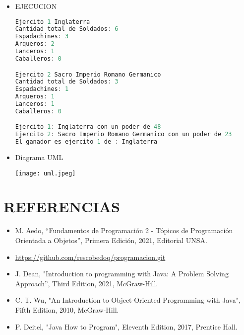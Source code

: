 \documentclass{article}
\begin{document}
\begin{itemize}
\begin{lstlisting}[language=java]
        \end{lstlisting}

        \item EJECUCION
        \begin{lstlisting}[language=java]
Ejercito 1 Inglaterra
Cantidad total de Soldados: 6
Espadachines: 3
Arqueros: 2
Lanceros: 1
Caballeros: 0

Ejercito 2 Sacro Imperio Romano Germanico
Cantidad total de Soldados: 3
Espadachines: 1
Arqueros: 1
Lanceros: 1
Caballeros: 0

Ejercito 1: Inglaterra con un poder de 48
Ejercito 2: Sacro Imperio Romano Germanico con un poder de 23
El ganador es ejercito 1 de : Inglaterra
        \end{lstlisting}

        \item Diagrama UML
 
             \texttt{[image: uml.jpeg]}
        
	\end{itemize}

	\section{REFERENCIAS}
	\begin{itemize}
		\item M. Aedo, “Fundamentos de Programación 2 - Tópicos de Programación Orientada a Objetos”, Primera Edición, 2021, Editorial UNSA.
		\item \url{https://github.com/rescobedoq/programacion.git}
		\item J. Dean, "Introduction to programming with Java: A Problem Solving Approach”, Third Edition, 2021, McGraw-Hill.
        \item C. T. Wu, "An Introduction to Object-Oriented Programming with Java", Fifth Edition, 2010, McGraw-Hill.
        \item P. Deitel, "Java How to Program", Eleventh Edition, 2017, Prentice Hall.
	\end{itemize}
	
%
%
%
			
\end{document}
